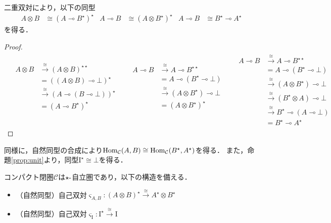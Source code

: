 \documentclass[type_judgement.tex]{subfiles}
\begin{document}
二重双対により，以下の同型
\begin{align*}
    A \otimes B &\cong (A \multimap B^\star)^\star  &  A \multimap B &\cong (A \otimes B^\star)^\star  &  A \multimap B &\cong B^\star \multimap A^\star
\end{align*}
を得る．
\begin{proof}
\begin{align*}
&\begin{aligned}
    A \otimes B &\xrightarrow{\cong} (A \otimes B)^{\star\star} \\
    &= ((A \otimes B) \multimap \bot)^\star \\
    &\xrightarrow{\cong} (A \multimap (B \multimap \bot))^\star \\
    &= (A \multimap B^\star)^\star \\
    & \\
    &
\end{aligned}
&
&\begin{aligned}
    A \multimap B &\xrightarrow{\cong} A \multimap B^{\star\star} \\
    &= A \multimap (B^\star \multimap \bot) \\
    &\xrightarrow{\cong} (A \otimes B^\star) \multimap \bot \\
    &= (A \otimes B^\star)^\star \\
    & \\
    &
\end{aligned}
&
&\begin{aligned}
    A \multimap B &\xrightarrow{\cong} A \multimap B^{\star\star} \\
    &= A \multimap (B^\star \multimap \bot) \\
    &\xrightarrow{\cong} (A \otimes B^\star) \multimap \bot \\
    &\xrightarrow{\cong} (B^\star \otimes A) \multimap \bot \\
    &\xrightarrow{\cong} B^\star \multimap (A \multimap \bot) \\
    &= B^\star \multimap A^\star
\end{aligned}
\end{align*}
\end{proof}

同様に，自然同型の合成により$\mathop{\mathrm{Hom}}\nolimits_\mathcal{C}(A,B) \cong \mathop{\mathrm{Hom}}\nolimits_\mathcal{C}(B^\star, A^\star)$を得る．
また，命題\ref{prop:unit}より，同型$\mathrm{I}^\star \cong \bot$を得る．

\begin{defn}
コンパクト閉圏$\mathcal{C}$は$\star\mathchar`-$自立圏であり，以下の構造を備える．
\begin{itemize}
    \item （自然同型）自己双対$\varsigma_{A,B}:(A \otimes B)^\star \xrightarrow{\cong} A^\star \otimes B^\star$
    \item （自然同型）自己双対$\varsigma_\mathrm{I}:\mathrm{I}^\star \xrightarrow{\cong} \mathrm{I}$
\end{itemize}
\end{defn}
\end{document}
